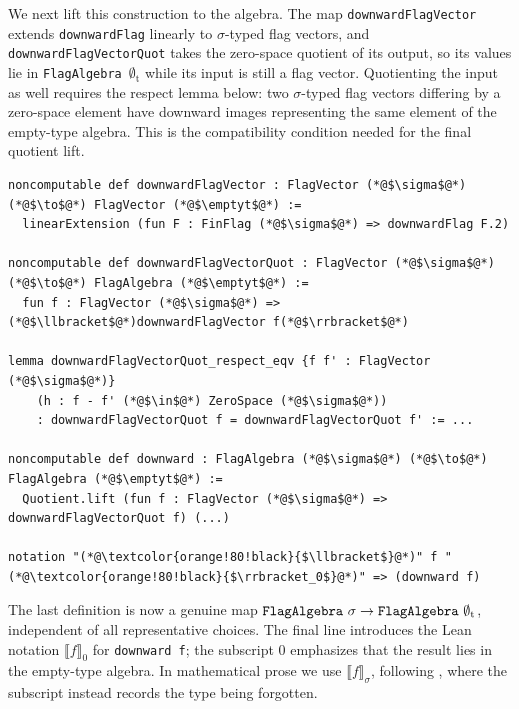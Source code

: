 \documentclass[acmsmall,screen=true,acmthm=false]{acmart}
\DeclareRobustCommand{\lean}[1]{{\def\_{\textunderscore\allowbreak}\texttt{#1}}}
\newcommand{\emptyt}{\emptyset_{\mathrm{t}}}
\begin{document}
We next lift this construction to the algebra.  The map
\lean{downwardFlagVector} extends \lean{downwardFlag} linearly to
$\sigma$-typed flag vectors, and \lean{downwardFlagVectorQuot} takes the
zero-space quotient of its output, so its values lie in
\lean{FlagAlgebra}~$\emptyt$ while its input is still a flag vector.
Quotienting the input as well requires the respect lemma below: two
$\sigma$-typed flag vectors differing by a zero-space element have downward
images representing the same element of the empty-type algebra.  This is the
compatibility condition needed for the final quotient lift.
\begin{lstlisting}
noncomputable def downwardFlagVector : FlagVector (*@$\sigma$@*) (*@$\to$@*) FlagVector (*@$\emptyt$@*) :=
  linearExtension (fun F : FinFlag (*@$\sigma$@*) => downwardFlag F.2)

noncomputable def downwardFlagVectorQuot : FlagVector (*@$\sigma$@*) (*@$\to$@*) FlagAlgebra (*@$\emptyt$@*) :=
  fun f : FlagVector (*@$\sigma$@*) => (*@$\llbracket$@*)downwardFlagVector f(*@$\rrbracket$@*)

lemma downwardFlagVectorQuot_respect_eqv {f f' : FlagVector (*@$\sigma$@*)}
    (h : f - f' (*@$\in$@*) ZeroSpace (*@$\sigma$@*))
    : downwardFlagVectorQuot f = downwardFlagVectorQuot f' := ...

noncomputable def downward : FlagAlgebra (*@$\sigma$@*) (*@$\to$@*) FlagAlgebra (*@$\emptyt$@*) :=
  Quotient.lift (fun f : FlagVector (*@$\sigma$@*) => downwardFlagVectorQuot f) (...)

notation "(*@\textcolor{orange!80!black}{$\llbracket$}@*)" f "(*@\textcolor{orange!80!black}{$\rrbracket_0$}@*)" => (downward f)
\end{lstlisting}
The last definition is now a genuine map
\(\lean{FlagAlgebra}~\sigma\to\lean{FlagAlgebra}~\emptyt\), independent of all
representative choices.  The final line introduces the Lean notation
\(\llbracket f\rrbracket_0\) for \lean{downward f}; the subscript $0$
emphasizes that the result lies in the empty-type algebra.  In mathematical
prose we use \(\llbracket f\rrbracket_\sigma\), following
, where the subscript instead records the type
being forgotten.
\end{document}
